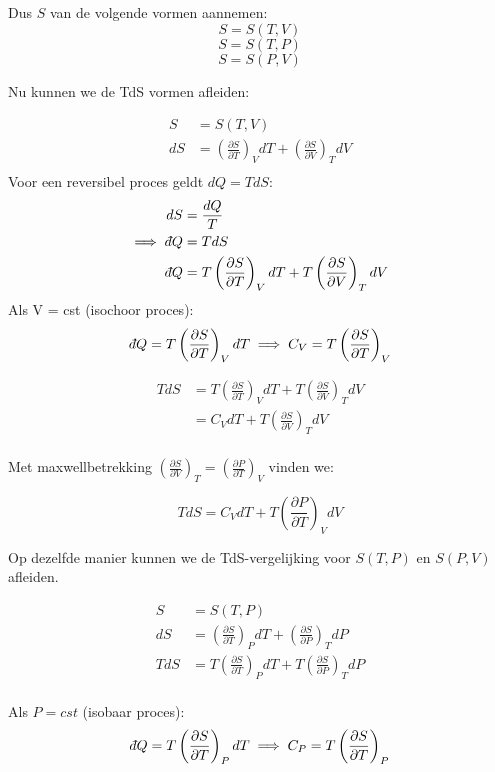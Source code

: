 Dus \(S\) van de volgende vormen aannemen:
\[S = S(T,V)\]
\[S = S(T,P)\]
\[S = S(P,V)\]

Nu kunnen we de TdS vormen afleiden:

\begin{align*}
    S &= S(T,V) \\
    dS &= \left(\frac{\partial S}{\partial T}\right)_V dT + \left(\frac{\partial S}{\partial V}\right)_T dV \\
\end{align*}
Voor een reversibel proces geldt \(dQ = TdS\):
\begin{align*}
    dS &= \frac{dQ}{T} \\
    \implies \dbar Q &= TdS \\
    \dbar Q &= T\left(\frac{\partial S}{\partial T}\right)_V dT + T\left(\frac{\partial S}{\partial V}\right)_T dV \\
\end{align*}
Als V = cst (isochoor proces):
\[\dbar Q = T\left(\frac{\partial S}{\partial T}\right)_V dT \implies C_V = T\left(\frac{\partial S}{\partial T}\right)_V\]

\begin{align*}
    TdS &= T\left(\frac{\partial S}{\partial T}\right)_V dT + T\left(\frac{\partial S}{\partial V}\right)_T dV \\
    &= C_V dT + T\left(\frac{\partial S}{\partial V}\right)_T   dV \\
\end{align*}

Met maxwellbetrekking \(\left(\frac{\partial S}{\partial V}\right)_T = \left(\frac{\partial P}{\partial T}\right)_V\) vinden we:

\[\boxed{TdS = C_V dT + T\left(\frac{\partial P}{\partial T}\right)_V dV}\]

Op dezelfde manier kunnen we de TdS-vergelijking voor \(S(T,P)\) en \(S(P,V)\) afleiden.

\begin{align*}
    S &= S(T,P) \\
    dS &= \left(\frac{\partial S}{\partial T}\right)_P dT + \left(\frac{\partial S}{\partial P}\right)_T dP \\
    TdS &= T\left(\frac{\partial S}{\partial T}\right)_P dT + T\left(\frac{\partial S}{\partial P}\right)_T dP \\
\end{align*}

Als \(P = cst\) (isobaar proces):
\[\dbar Q = T\left(\frac{\partial S}{\partial T}\right)_P dT \implies C_P = T\left(\frac{\partial S}{\partial T}\right)_P\]

